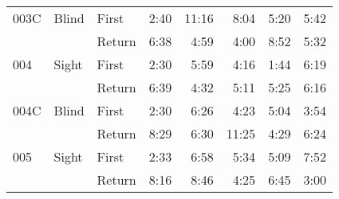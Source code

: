 \begin{table}[!htb]
\begin{tabular}{lllrrrrr}
003C & Blind & First &   2:40 &  11:16 &                                                  8:04 &                                                   5:20 &    5:42 \\
    &       & Return &   6:38 &   4:59 &                                                  4:00 &                                                   8:52 &    5:32 \\
004 & Sight & First &   2:30 &   5:59 &                                                  4:16 &                                                   1:44 &    6:19 \\
    &       & Return &   6:39 &   4:32 &                                                  5:11 &                                                   5:25 &    6:16 \\
004C & Blind & First &   2:30 &   6:26 &                                                  4:23 &                                                   5:04 &    3:54 \\
    &       & Return &   8:29 &   6:30 &                                                 11:25 &                                                   4:29 &    6:24 \\
005 & Sight & First &   2:33 &   6:58 &                                                  5:34 &                                                   5:09 &    7:52 \\
    &       & Return &   8:16 &   8:46 &                                                  4:25 &                                                   6:45 &    3:00 \\
\bottomrule
\end{tabular}
\end{table}


